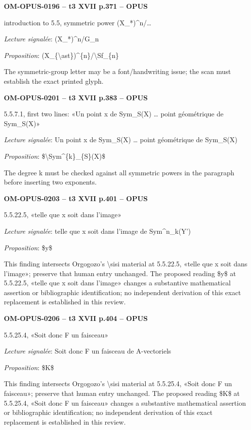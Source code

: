\par\noindent\textbf{OM-OPUS-0196 -- t3 XVII p.371 -- OPUS}\par
introduction to 5.5, symmetric power (X\_*)\textasciicircum{}n/…\par
\emph{Lecture signalée}: (X\_*)\textasciicircum{}n/G\_n\par
\emph{Proposition}: (X\_\{\textbackslash{}ast\})\textasciicircum{}\{n\}/\textbackslash{}Sf\_\{n\}\par
The symmetric-group letter may be a font/handwriting issue; the scan must establish the exact printed glyph.\par
\par\noindent\textbf{OM-OPUS-0201 -- t3 XVII p.383 -- OPUS}\par
5.5.7.1, first two lines: «Un point x de Sym\_S(X) … point géométrique de Sym\_S(X)»\par
\emph{Lecture signalée}: Un point x de Sym\_S(X) … point géométrique de Sym\_S(X)\par
\emph{Proposition}: \$\textbackslash{}Sym\textasciicircum{}\{k\}\_\{S\}(X)\$\par
The degree k must be checked against all symmetric powers in the paragraph before inserting two exponents.\par
\par\noindent\textbf{OM-OPUS-0203 -- t3 XVII p.401 -- OPUS}\par
5.5.22.5, «telle que x soit dans l'image»\par
\emph{Lecture signalée}: telle que x soit dans l'image de Sym\textasciicircum{}n\_k(Y')\par
\emph{Proposition}: \$y\$\par
This finding intersects Orgogozo's \textbackslash{}sisi material at 5.5.22.5, «telle que x soit dans l'image»; preserve that human entry unchanged. The proposed reading \$y\$ at 5.5.22.5, «telle que x soit dans l'image» changes a substantive mathematical assertion or bibliographic identification; no independent derivation of this exact replacement is established in this review.\par
\par\noindent\textbf{OM-OPUS-0206 -- t3 XVII p.404 -- OPUS}\par
5.5.25.4, «Soit donc F un faisceau»\par
\emph{Lecture signalée}: Soit donc F un faisceau de A-vectoriels\par
\emph{Proposition}: \$K\$\par
This finding intersects Orgogozo's \textbackslash{}sisi material at 5.5.25.4, «Soit donc F un faisceau»; preserve that human entry unchanged. The proposed reading \$K\$ at 5.5.25.4, «Soit donc F un faisceau» changes a substantive mathematical assertion or bibliographic identification; no independent derivation of this exact replacement is established in this review.\par
